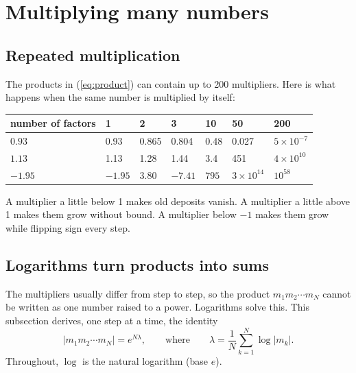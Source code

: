 \documentclass[11pt]{article}
\begin{document}
\section{Multiplying many numbers}

\subsection{Repeated multiplication}

The products in (\ref{eq:product}) can contain up to 200 multipliers. Here is what happens when the same number is multiplied by itself:

\begin{center}
\begin{tabular}{lllllll}
\toprule
number of factors & 1 & 2 & 3 & 10 & 50 & 200 \\
\midrule
$0.93$ & 0.93 & 0.865 & 0.804 & 0.48 & 0.027 & $5\times10^{-7}$ \\
$1.13$ & 1.13 & 1.28 & 1.44 & 3.4 & 451 & $4\times10^{10}$ \\
$-1.95$ & $-1.95$ & 3.80 & $-7.41$ & $795$ & $3\times10^{14}$ & $10^{58}$ \\
\bottomrule
\end{tabular}
\end{center}

A multiplier a little below 1 makes old deposits vanish. A multiplier a little above 1 makes them grow without bound. A multiplier below $-1$ makes them grow while flipping sign every step.

\subsection{Logarithms turn products into sums}

The multipliers usually differ from step to step, so the product $m_1m_2\cdots m_N$ cannot be written as one number raised to a power. Logarithms solve this. This subsection derives, one step at a time, the identity
\begin{equation}\label{eq:lyap}
|m_1 m_2\cdots m_N|=e^{N\lambda},\qquad\text{where}\qquad \lambda=\frac1N\sum_{k=1}^{N}\log|m_k| .
\end{equation}
Throughout, $\log$ is the natural logarithm (base $e$).
\end{document}
